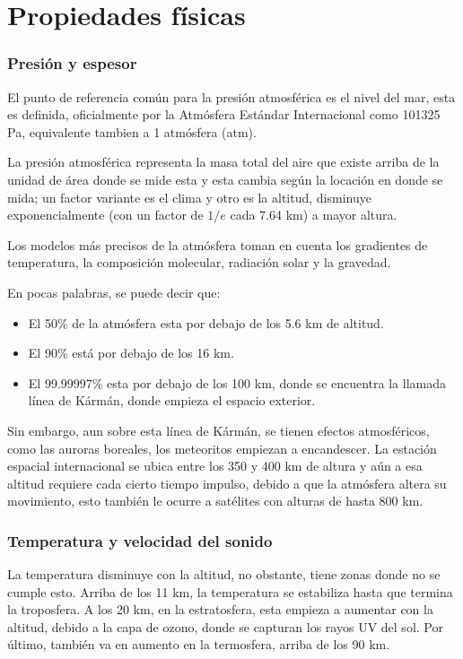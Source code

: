 \documentclass{article}
\begin{document}
\section{Propiedades físicas}


\subsubsection {Presión y espesor}

El punto de referencia común para la presión atmosférica es el nivel del mar, esta es definida, oficialmente por la Atmósfera Estándar Internacional como 101325 Pa, equivalente tambien a 1 atmósfera (atm).  

La presión atmosférica representa la masa total del aire que existe arriba de la unidad de área donde se mide esta y esta cambia según la locación en donde se mida; un factor variante es el clima y otro es la altitud, disminuye exponencialmente (con un factor de $1/e$ cada 7.64 km)  a mayor altura. 

Los modelos más precisos de la atmósfera toman en cuenta los gradientes de temperatura, la composición molecular, radiación solar y la gravedad.

En pocas palabras, se puede decir que:
\begin{itemize}
\item El 50\% de la atmósfera esta por debajo de los 5.6 km de altitud.
\item El 90\% está por debajo de los 16 km.
\item El 99.99997\% esta por debajo de los 100 km, donde se encuentra la llamada línea de Kármán, donde empieza el espacio exterior.
\end{itemize}

Sin embargo, aun sobre esta línea de Kármán, se tienen efectos atmosféricos, como las auroras boreales, los meteoritos empiezan a encandescer. La estación espacial internacional se ubica entre los 350 y 400 km de altura y aún a esa altitud requiere cada cierto tiempo impulso, debido a que la atmósfera altera su movimiento, esto también le ocurre a satélites con alturas de hasta 800 km.


\subsubsection {Temperatura y velocidad del sonido}

La temperatura disminuye con la altitud, no obstante, tiene zonas donde no se cumple esto. Arriba de los 11 km, la temperatura se estabiliza hasta que termina la troposfera. A los 20 km, en la estratosfera, esta empieza a aumentar con la altitud, debido a la capa de ozono, donde se capturan los rayos UV del sol. Por último, también va en aumento en la termosfera, arriba de los 90 km. 
\end{document}
